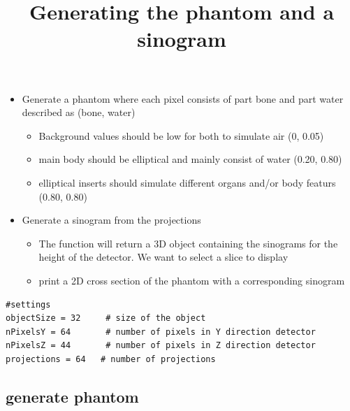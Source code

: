 \documentclass{article}
\title{Generating the phantom and a sinogram}
\date{\displaydate{articleDate}}
\author{}
\begin{document}
\maketitle

\begin{itemize}
\item Generate a phantom where each pixel consists of part bone and part water described as (bone, water)

\begin{itemize}
\item Background values should be low for both to simulate air (0, 0.05)
\item main body should be elliptical and mainly consist of water (0.20, 0.80)
\item elliptical inserts should simulate different organs and/or body featurs (0.80, 0.80)
\end{itemize}


\item Generate a sinogram from the projections

\begin{itemize}
\item The function will return a 3D object containing the sinograms for the height of the detector. We want to select a slice to display
\item print a 2D cross section of the phantom with a corresponding sinogram
\end{itemize}
\end{itemize}

\begin{verbatim}
#settings
objectSize = 32     # size of the object
nPixelsY = 64       # number of pixels in Y direction detector
nPixelsZ = 44       # number of pixels in Z direction detector
projections = 64   # number of projections
\end{verbatim}

\subsection{generate phantom}
\end{document}
